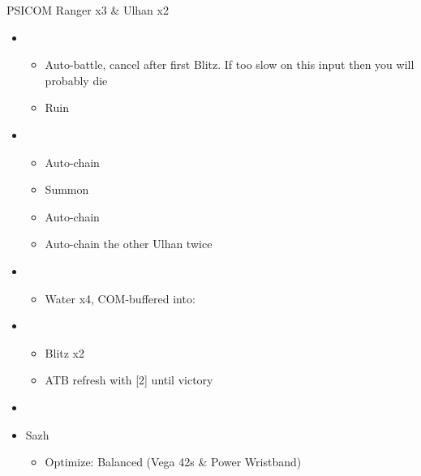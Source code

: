 \documentclass{report}
\begin{document}
\begin{battle}{PSICOM Ranger x3 \& Ulhan x2}
\begin{itemize}
    \item \second
    \begin{itemize}
        \item Auto-battle, cancel after first Blitz. If too slow on this input then you will probably die
        \item Ruin
    \end{itemize}
    \item \fourth
    \begin{itemize}
        \item Auto-chain
        \item Summon
        \item Auto-chain
    \end{itemize}
    \begin{itemize}
        \item Auto-chain the other Ulhan twice
    \end{itemize}
    \item \fourth
    \begin{itemize}
        \item Water x4, COM-buffered into:
    \end{itemize}
    \item \first
    \begin{itemize}
        \item Blitz x2
        \item ATB refresh with [2] until victory
    \end{itemize}
\end{itemize}
 
\end{battle}


\begin{menu}
\begin{itemize}
    \paradigm
    \begin{itemize}
        \item {}%
{\paradigmline{\com}{\rav}{}}%
{\paradigmline{\texit{\syn}}{\textit{\sab}}{}}%
{\paradigmline{\com}{(\sab)}{}}%
{\paradigmline{\rav}{\rav}{}}%
{\paradigmline{[\rav]}{(\sab)}{}}%
{\paradigmline{[\com]}{\rav}{}}
    \end{itemize}
    \equip
    \begin{itemize}
        \item Sazh
        \begin{itemize}
            \item Optimize: Balanced (Vega 42s \& Power Wristband)
        \end{itemize}
    \end{itemize}
\end{itemize}
\end{menu}
\end{document}
